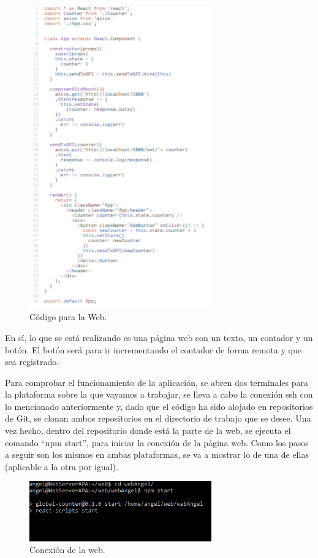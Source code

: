 \documentclass[english,runningheads,a4paper]{llncs}[2018/03/10]
\begin{document}
\begin{figure}[h!]
 \centering
 \includegraphics[width=0.7\textwidth]{./Web/Azure/CodigoWeb1.png}
 \caption{Código para la Web.}
\end{figure}

En sí, lo que se está realizando es una página web con un texto, un contador y un
botón. El botón será para ir incrementando el contador de forma remota y que sea
registrado.

Para comprobar el funcionamiento de la aplicación, se abren dos terminales para la
plataforma sobre la que vayamos a trabajar, se lleva a cabo la conexión ssh con lo
mencionado anteriormente y, dado que el código ha sido alojado en repositorios de
Git, se clonan ambos repositorios en el directorio de trabajo que se desee. Una vez
hecho, dentro del repositorio donde está la parte de la web, se ejecuta el comando
“npm start”, para iniciar la conexión de la página web. Como los pasos a seguir son
los mismos en ambas plataformas, se va a mostrar lo de una de ellas (aplicable a la
otra por igual).

\begin{figure}[h!]
 \centering
 \includegraphics[width=0.7\textwidth]{./Web/Azure/ConexionWeb.png}
 \caption{Conexión de la web.}
\end{figure}
\end{document}
